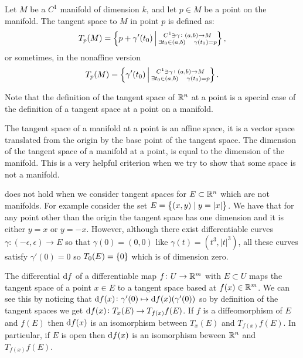 \documentclass[11pt,a4paper]{article}
\begin{document}
\begin{definition}
  Let $M$ be a $C^1$ manifold of dimension $k$, and let $p \in M$ 
  be a point on the manifold. The tangent space to $M$ in 
  point $p$ is defined as:
  \[
    T_p(M) = \left\{
      p + \gamma'(t_0) \,\middle\vert\,
      \substack{
      C^1 \ni \gamma \colon (a,b) \to M \\
      \exists t_0 \in (a,b) \quad \gamma(t_0) = p}
    \right\},
  \]
  or sometimes, in the nonaffine version
  \[
    T_p(M) = \left\{
      \gamma'(t_0) \,\middle\vert\, 
      \substack{
      C^1 \ni \gamma \colon (a,b) \to M \\
      \exists t_0 \in (a,b) \quad \gamma(t_0) = p}
    \right\}.
  \]
\end{definition}
\begin{remark}
  Note that the definition of the tangent space of $\mathbb{R}^n$ at a point
  is a special case of the definition of a tangent space at a point
  on a manifold.
\end{remark}
\begin{remark}
  \label{rmk:dimension-of-tangent-space}
  The tangent space of a manifold at a point is an affine space,
  it is a vector space translated from the origin
  by the base point of the tangent space.
  The dimension of the tangent space of a manifold at a point,
  is equal to the dimension of the manifold.
  This is a very helpful criterion when we try to show that some space
  is not a manifold.
\end{remark}
\begin{example}
   does not hold when
  we consider tangent spaces for $E \subset \mathbb{R}^n$ which are not
  manifolds.
  For example consider the set $E = \left\{(x,y) \mid y = |x|\right\}$.
  We have that for any point other than the origin the tangent
  space has one dimension and it is either $y = x$ or $y = -x$.
  However, although there exist differentiable curves
  $\gamma \colon (-\epsilon,\epsilon) \to E$
  so that $\gamma(0) = (0,0)$
  like $\gamma(t) = (t^3,|t|^3)$,
  all these curves satisfy $\gamma'(0) = 0$
  so $T_0(E) = \left\{0\right\}$ which is of dimension zero.
\end{example}
\begin{remark}
  The differential $\mathrm{d} f$ of a differentiable map $f \colon U \to \mathbb{R}^m$
  with $E \subset U$ maps the tangent space of a point $x \in E$
  to a tangent space based at $f(x) \in \mathbb{R}^m$.
  We can see this by noticing that
  $\mathrm{d} f(x) \colon \gamma'(0) \mapsto \mathrm{d} f(x)(\gamma'(0))$
  so by definition of the tangent spaces
  we get $\mathrm{d} f(x) \colon T_x(E) \to T_{f(x)}f(E)$.
  If $f$ is a diffeomorphism of $E$ and $f(E)$ then $\mathrm{d} f(x)$
  is an isomorphism between $T_x(E)$ and $T_{f(x)}f(E)$.
  In particular, if $E$ is open then $\mathrm{d} f(x)$
  is an isomorphism beween $\mathbb{R}^n$ and $T_{f(x)}f(E)$.
\end{remark}
\end{document}
